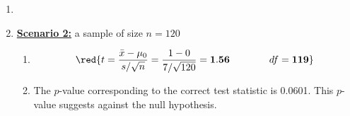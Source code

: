 \begin{enumerate}
\begin{enumerate}
\begin{enumerate}
\item \underline{Decision:}
\begin{itemize}
\item Reject the null hypothesis because the $p$-value $\leq$ $\alpha$.
\item Reject the null hypothesis because the $p$-value $>$ $\alpha$.
\item Fail to reject the null hypothesis because the $p$-value $\leq$ $\alpha$.
\item {}
\end{itemize}
\end{enumerate}
\item[]
\item \textbf{\underline{Scenario 2:}} a sample of size $n = 120$
\begin{enumerate}
\item  $$\red{t = \frac{\bar{x} - \mu_0}{s/\sqrt{n}} = \frac{1 - 0}{7/\sqrt{120}} = \mathbf{1.56} \qquad \qquad df = \mathbf{119}}$$

\item  The $p$-value corresponding to the correct test statistic is 0.0601. This $p$-value suggests \underline{} against the null hypothesis.


\end{enumerate}
\end{enumerate}
\end{enumerate}
